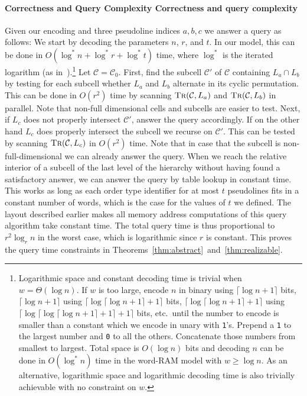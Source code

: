\paragraph*{\iftitlecase%
Correctness and Query Complexity\else%
Correctness and query complexity\fi} Given our encoding and three
pseudoline indices \(a,b,c\) we answer a query as follows: We start by decoding the
parameters \(n\), \(r\), and \(t\). In our model, this can be done in
\(O(\log^* n + \log^* r + \log^* t)\) time, where \(\log^*\) is the iterated
logarithm (as in~\cite{Ma93}).\footnote{%
  Logarithmic space and constant decoding time is trivial when \(w =
  \Theta(\log n)\).
  If \(w\) is too large, encode \(n\) in binary using \(\lceil \log n + 1\rceil\)
  bits, \(\lceil \log n + 1\rceil\) using \(\lceil \log \lceil \log n + 1
  \rceil +1 \rceil\) bits,
  \(\lceil \log \lceil \log n + 1\rceil +1\rceil\) using \(\lceil \log \lceil
  \log \lceil \log n + 1\rceil +1\rceil +1\rceil\) bits,
  etc.\ until the number to encode is smaller than a constant which we encode
  in unary with \texttt{1}'s. Prepend a \texttt{1} to the largest number and
  \texttt{0} to all the others. Concatenate those numbers
  from smallest to largest. Total space is \(O(\log n)\) bits and decoding
  \(n\) can be done in \(O(\log^* n)\) time in the word-RAM model with \(w \geq
  \log n\).
  As an alternative, logarithmic space and logarithmic decoding time is also
  trivially achievable with no constraint on \(w\).%
}
Let \(\mathcal{C} = \mathcal{C}_{0}\).
First, find the subcell \(\mathcal{C}'\) of \(\mathcal{C}\) containing \(L_a
\cap L_b\) by testing for each subcell whether
\(L_a\) and \(L_b\) alternate in its cyclic permutation.
This can be done in \(O(r^2)\) time by scanning \(\textsc{Tr}(\mathcal{C},
L_a)\) and \(\textsc{Tr}(\mathcal{C}, L_b)\) in parallel. Note that non-full
dimensional cells and subcells are easier to test. Next, if \(L_c\) does
not properly intersect \(\mathcal{C}'\), answer the query accordingly. If on
the other hand \(L_c\) does properly intersect the subcell we recurse on
\(\mathcal{C}'\). This can be tested by scanning \(\textsc{Tr}(\mathcal{C},
L_c)\) in \(O(r^2)\) time. Note that in case that the subcell is
non-full-dimensional we can already answer the query. When we
reach the relative interior of a subcell of the last level of the hierarchy
without having found a satisfactory answer, we can answer the query by table
lookup in constant time. This works as long as each order type identifier for
at most \(t\) pseudolines fits in a constant number of words, which is the case
for the values of \(t\) we defined.
%
The layout described earlier makes all memory address computations of this
query algorithm take constant time.
%
The total query time is thus proportional
to \(r^2 \log_r n\) in the worst case, which is logarithmic since \(r\) is
constant.
%
This proves the query time constraints in
Theorems~\ref{thm:abstract}~and~\ref{thm:realizable}.

